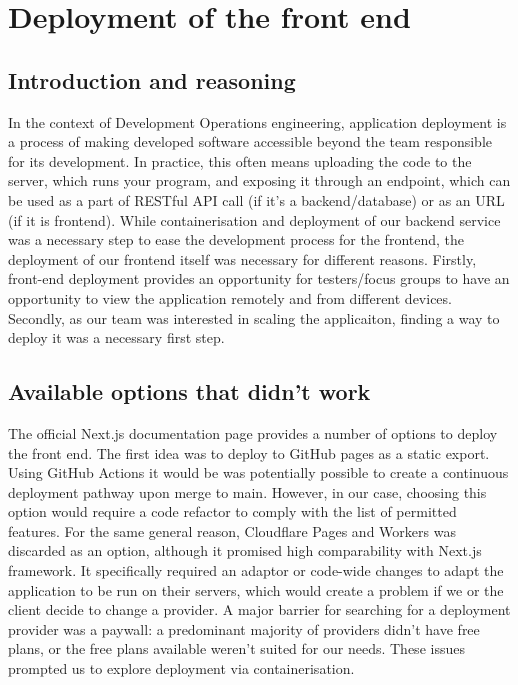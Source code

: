 \section{Deployment of the front end}

\subsection{Introduction and reasoning}
In the context of Development Operations engineering, application deployment is a process of making developed software accessible beyond the team responsible for its development. In practice, this often means uploading the code to the server, which runs your program, and exposing it through an endpoint, which can be used as a part of RESTful API call (if it's a backend/database) or as an URL (if it is frontend). While containerisation and deployment of our backend service was a necessary step to ease the development process for the frontend, the deployment of our frontend itself was necessary for different reasons. Firstly, front-end deployment provides an opportunity for testers/focus groups to have an opportunity to view the application remotely and from different devices. Secondly, as our team was interested in scaling the applicaiton, finding a way to deploy it was a necessary first step.

\subsection{Available options that didn't work}
The official Next.js documentation page \cite{vercelMainDeploymentMainPage} provides a number of options to deploy the front end. The first idea was to deploy to GitHub pages as a static export. Using GitHub Actions it would be was potentially possible to create a continuous deployment pathway upon merge to main. However, in our case, choosing this option would require a code refactor to comply with the list of permitted features. For the same general reason, Cloudflare Pages and Workers was discarded as an option, although it promised high comparability with Next.js framework. It specifically required an adaptor or code-wide changes to adapt the application to be run on their servers, which would create a problem if we or the client decide to change a provider. A major barrier for searching for a deployment provider was a paywall: a predominant majority of providers didn't have free plans, or the free plans available weren't suited for our needs. These issues prompted us to explore deployment via containerisation. 

